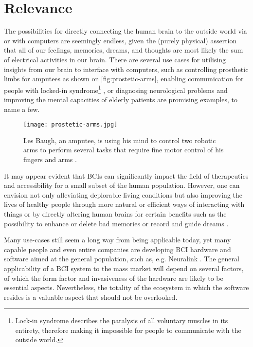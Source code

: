 \section{Relevance}
\label{chapter1-relevance}

The possibilities for directly connecting the human brain to the outside world via or with computers are seemingly endless, given the (purely physical) assertion that all of our feelings, memories, dreams, and thoughts are most likely the sum of electrical activities in our brain. There are several use cases for utilising insights from our brain to interface with computers, such as controlling prosthetic limbs for amputees as shown on \autoref{fig:prostetic-arms}, enabling communication for people with locked-in syndrome\footnote{Lock-in syndrome describes the paralysis of all voluntary muscles in its entirety, therefore making it impossible for people to communicate with the outside world.} \citep{chaudhary_spelling_2022}, or diagnosing neurological problems and improving the mental capacities of elderly patients \citep{belkacem_brain_2020} are promising examples, to name a few.

\begin{figure}[ht]
  \centering
  \texttt{[image: prostetic-arms.jpg]}
  \caption{Les Baugh, an amputee, is using his mind to control two robotic arms to perform several tasks that require fine motor control of his fingers and arms \citep{campbell_amputee_2014}.}
  \label{fig:prostetic-arms}
\end{figure}

It may appear evident that BCIs can significantly impact the field of therapeutics and accessibility for a small subset of the human population. However, one can envision not only alleviating deplorable living conditions but also improving the lives of healthy people through more natural or efficient ways of interacting with things or by directly altering human brains for certain benefits such as the possibility to enhance or delete bad memories \citep{spiers_enhance_2014} or record and guide dreams \citep{haar_horowitz_dormio_2020}.

Many use-cases still seem a long way from being applicable today, yet many capable people and even entire companies are developing BCI hardware and software aimed at the general population, such as, e.g. Neuralink \citep{urban_neuralink_2017}. The general applicability of a BCI system to the mass market will depend on several factors, of which the form factor and invasiveness of the hardware are likely to be essential aspects. Nevertheless, the totality of the ecosystem in which the software resides is a valuable aspect that should not be overlooked.

